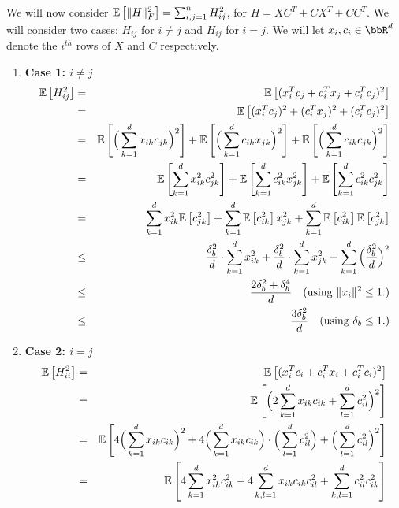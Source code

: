 We will now consider $\expect{}{\|H\|_F^2} = \sum_{i,j=1}^n H_{ij}^2$, for $H = XC^T + CX^T + CC^T$.
We will consider two cases: $H_{ij}$ for $i\neq j$ and $H_{ij}$ for $i=j$.
We will let $x_i, c_i \in \RR^d$ denote the $i^{th}$ rows of $X$ and $C$ respectively.\\
\begin{enumerate}
\item \textbf{Case 1: $i\neq j$}\\
\begin{eqnarray*}
	\expect{}{H_{ij}^2} &=& \expect{}{(x_i^T c_j + c_i^T x_j + c_i^T c_j)^2} \\
	&=& \expect{}{(x_i^T c_j)^2 + (c_i^T x_j)^2 + (c_i^T c_j)^2} \\
	&=& \expect{}{\Big(\sum_{k=1}^d x_{ik} c_{jk}\Big)^2} + \expect{}{\Big(\sum_{k=1}^d c_{ik} x_{jk}\Big)^2} + \expect{}{\Big(\sum_{k=1}^d c_{ik} c_{jk}\Big)^2} \\
	&=& \expect{}{\sum_{k=1}^d x_{ik}^2 c_{jk}^2} + \expect{}{\sum_{k=1}^d c_{ik}^2 x_{jk}^2} + \expect{}{\sum_{k=1}^d c_{ik}^2 c_{jk}^2}\\
	&=& \sum_{k=1}^d x_{ik}^2 \expect{}{c_{jk}^2} + \sum_{k=1}^d \expect{}{c_{ik}^2} x_{jk}^2 + \sum_{k=1}^d \expect{}{c_{ik}^2} \expect{}{c_{jk}^2}\\
	&\leq& \frac{\delta_b^2}{d}\cdot \sum_{k=1}^d x_{ik}^2 + \frac{\delta_b^2}{d}\cdot \sum_{k=1}^d x_{jk}^2 + \sum_{k=1}^d \Big(\frac{\delta_b^2}{d}\Big)^2 \\
	&\leq& \frac{2\delta_b^2 + \delta_b^4}{d} \quad \text{(using $\|x_i\|^2 \leq 1$.)} \\
	&\leq& \frac{3\delta_b^2}{d} \quad \text{(using $\delta_b \leq 1$.)} \\
\end{eqnarray*}
\item \textbf{Case 2: $i = j$}\\
\begin{eqnarray*}
	\expect{}{H_{ii}^2} &=& \expect{}{(x_i^T c_i + c_i^T x_i + c_i^T c_i)^2} \\
	&=& \expect{}{\Big(2 \sum_{k=1}^d x_{ik} c_{ik}  + \sum_{l=1}^d c_{il}^2 \Big)^2} \\
	&=& \expect{}{4 \Big(\sum_{k=1}^d x_{ik} c_{ik}\Big)^2  + 4 \Big(\sum_{k=1}^d x_{ik} c_{ik}\Big)\cdot \Big(\sum_{l=1}^d c_{il}^2 \Big) + \Big(\sum_{l=1}^d c_{il}^2 \Big)^2} \\
	&=& \expect{}{4 \sum_{k=1}^d x_{ik}^2 c_{ik}^2  + 4 \sum_{k,l=1}^d x_{ik} c_{ik} c_{il}^2  + \sum_{k,l=1}^d c_{il}^2 c_{ik}^2 } \\

\end{eqnarray*}
\end{enumerate}
